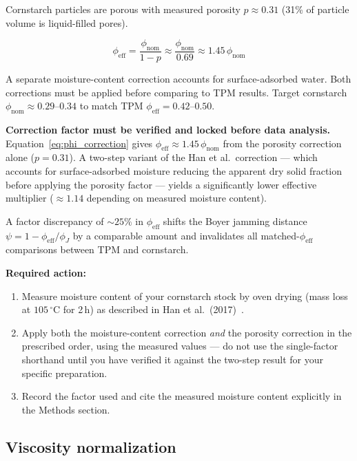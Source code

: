 \documentclass[11pt,letterpaper]{article}
\newcommand{\phieff}{\phi_{\mathrm{eff}}}
\newcommand{\phinom}{\phi_{\mathrm{nom}}}
\newcommand{\phiJ}{\phi_{J}}
\begin{document}
Cornstarch particles are porous with measured porosity $p \approx 0.31$
(31\% of particle volume is liquid-filled pores).

\begin{equation}
  \phieff = \frac{\phinom}{1 - p} \approx \frac{\phinom}{0.69} \approx 1.45\,\phinom
  \label{eq:phi_correction}
\end{equation}

A separate moisture-content correction accounts for surface-adsorbed water.
Both corrections must be applied before comparing to TPM results. Target
cornstarch $\phinom \approx 0.29$--$0.34$ to match TPM $\phieff = 0.42$--$0.50$.

\begin{cautionbox}
\textbf{Correction factor must be verified and locked before data analysis.}
Equation~\eqref{eq:phi_correction} gives $\phieff \approx 1.45\,\phinom$ from the
porosity correction alone ($p = 0.31$). A two-step variant of the Han et al.\
correction --- which accounts for surface-adsorbed moisture reducing the
apparent dry solid fraction before applying the porosity factor --- yields a
significantly lower effective multiplier (${\approx}1.14$ depending on measured
moisture content).

A factor discrepancy of ${\sim}25\%$ in $\phieff$ shifts the Boyer jamming distance
$\psi = 1 - \phieff/\phiJ$ by a comparable amount and invalidates all matched-$\phieff$
comparisons between TPM and cornstarch.

\noindent \textbf{Required action:}
\begin{enumerate}[noitemsep,topsep=3pt]
  \item Measure moisture content of your cornstarch stock by oven drying (mass loss
    at $105\,^\circ$C for 2\,h) as described in Han et al.\ (2017)~\cite{HanVanHa2017}.
  \item Apply both the moisture-content correction \emph{and} the porosity correction
    in the prescribed order, using the measured values --- do not use the single-factor
    shorthand until you have verified it against the two-step result for your specific
    preparation.
  \item Record the factor used and cite the measured moisture content explicitly in
    the Methods section.
\end{enumerate}
\end{cautionbox}

\subsection{Viscosity normalization}
\end{document}
